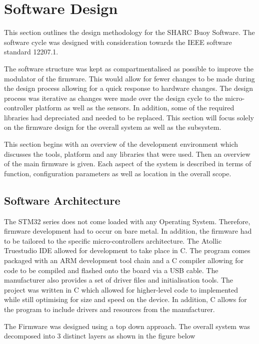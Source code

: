 \chapter{Software Design}
\label{ch:ch5}
This section outlines the design methodology for the SHARC Buoy Software. The software cycle was designed with consideration towards the IEEE software standard 12207.1.


The software structure was kept as compartmentalised as possible to improve the modulator of the firmware. This would allow for fewer changes to be made during the design process allowing for a quick response to hardware changes. The design process was iterative as changes were made over the design cycle to the micro-controller platform as well as the sensors. In addition, some of the required libraries had depreciated and needed to be replaced.  This section will focus solely on the firmware design for the overall system as well as the subsystem. 

This section begins with an overview of the development environment which discusses the tools, platform and any libraries that were used. Then an overview of the main firmware is given. Each aspect of the system is described in terms of function, configuration parameters as well as location in the overall scope.

\section{Software Architecture}

The STM32 series does not come loaded with any Operating System. Therefore, firmware development had to occur on bare metal. In addition, the firmware had to be tailored to the specific micro-controllers architecture. The Atollic Truestudio IDE allowed for development to take place in C. The program comes packaged with an ARM development tool chain and a C compiler allowing for code to be compiled and flashed onto the board via a USB cable. The manufacturer also provides a set of driver files and  initialisation tools. The project was written in C which allowed for higher-level code to implemented while still optimising for size and speed on the device. In addition, C allows for the program to include drivers and resources from the manufacturer. \par 

The Firmware was designed using a top down approach. The overall system was decomposed into 3 distinct layers as shown in the figure below

